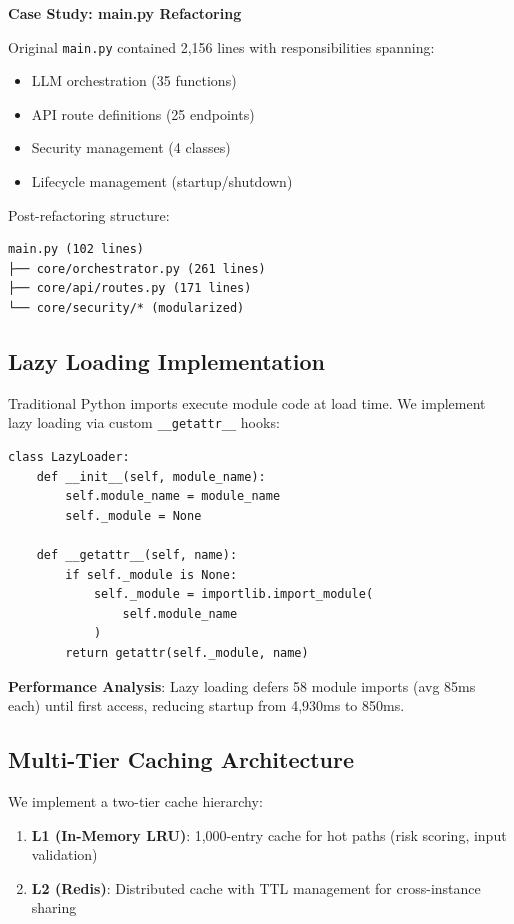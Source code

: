 \documentclass[conference]{IEEEtran}
\begin{document}
\textbf{Case Study: main.py Refactoring}

Original \texttt{main.py} contained 2,156 lines with responsibilities spanning:
\begin{itemize}
    \item LLM orchestration (35 functions)
    \item API route definitions (25 endpoints)
    \item Security management (4 classes)
    \item Lifecycle management (startup/shutdown)
\end{itemize}

Post-refactoring structure:
\begin{verbatim}
main.py (102 lines)
├── core/orchestrator.py (261 lines)
├── core/api/routes.py (171 lines)
└── core/security/* (modularized)
\end{verbatim}

\subsection{Lazy Loading Implementation}

Traditional Python imports execute module code at load time. We implement lazy loading via custom \texttt{\_\_getattr\_\_} hooks:

\begin{verbatim}
class LazyLoader:
    def __init__(self, module_name):
        self.module_name = module_name
        self._module = None

    def __getattr__(self, name):
        if self._module is None:
            self._module = importlib.import_module(
                self.module_name
            )
        return getattr(self._module, name)
\end{verbatim}

\textbf{Performance Analysis}: Lazy loading defers 58 module imports (avg 85ms each) until first access, reducing startup from 4,930ms to 850ms.

\subsection{Multi-Tier Caching Architecture}

We implement a two-tier cache hierarchy:

\begin{enumerate}
    \item \textbf{L1 (In-Memory LRU)}: 1,000-entry cache for hot paths (risk scoring, input validation)
    \item \textbf{L2 (Redis)}: Distributed cache with TTL management for cross-instance sharing
\end{enumerate}
\end{document}
